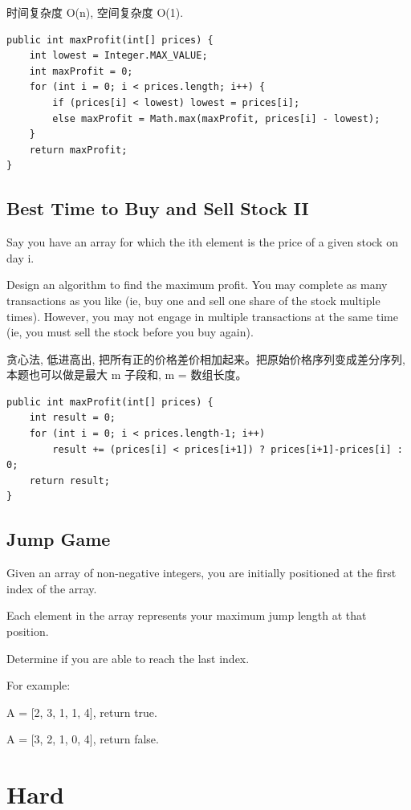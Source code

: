 \documentclass[12pt]{book}
\begin{document}
时间复杂度 O(n), 空间复杂度 O(1).

\lstset{language=java,label= ,caption= ,numbers=none}
\begin{lstlisting}
public int maxProfit(int[] prices) {
    int lowest = Integer.MAX_VALUE;
    int maxProfit = 0;
    for (int i = 0; i < prices.length; i++) {
        if (prices[i] < lowest) lowest = prices[i];
        else maxProfit = Math.max(maxProfit, prices[i] - lowest);
    }
    return maxProfit;
}
\end{lstlisting}

\subsection{Best Time to Buy and Sell Stock II}
\label{sec-13-1-3}
Say you have an array for which the ith element is the price of a given stock on day i.

Design an algorithm to find the maximum profit. You may complete as many transactions as you like (ie, buy one and sell one share of the stock multiple times). However, you may not engage in multiple transactions at the same time (ie, you must sell the stock before you buy again).

贪心法, 低进高出, 把所有正的价格差价相加起来。把原始价格序列变成差分序列, 本题也可以做是最大 m 子段和, m = 数组长度。

\lstset{language=java,label= ,caption= ,numbers=none}
\begin{lstlisting}
public int maxProfit(int[] prices) {
    int result = 0;
    for (int i = 0; i < prices.length-1; i++) 
        result += (prices[i] < prices[i+1]) ? prices[i+1]-prices[i] : 0;
    return result;
}
\end{lstlisting}

\subsection{Jump Game}
\label{sec-13-1-4}
Given an array of non-negative integers, you are initially positioned at the first index of the array.

Each element in the array represents your maximum jump length at that position.

Determine if you are able to reach the last index.

For example:

A = [2, 3, 1, 1, 4], return true.

A = [3, 2, 1, 0, 4], return false.

\section{Hard}
\label{sec-13-2}
\end{document}
